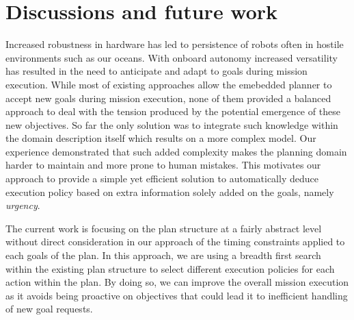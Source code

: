 \section{Discussions and future work}
\label{sec:conclude}

Increased robustness in hardware has led to persistence of robots
often in hostile environments such as our oceans. With onboard
autonomy increased versatility has resulted in the need to anticipate
and adapt to goals during mission execution. While most of existing
approaches allow the emebedded planner to accept new goals during
mission execution, none of them provided a balanced approach to deal
with the tension produced by the potential emergence of these new
objectives. So far the only solution was to integrate such knowledge
within the domain description itself which results on a more complex
model. Our experience demonstrated that such added complexity 
makes the planning domain harder to maintain and more prone to human
mistakes. This motivates our approach to provide a simple yet efficient 
solution to automatically deduce execution policy based on
extra information solely added on the goals, namely {\em urgency}.


The current work is focusing on the plan structure at a fairly
abstract level without direct consideration in our approach of the
timing constraints applied to each goals of the plan. In this approach,
we are using a breadth first search within the existing plan
structure to select different execution policies for each action
within the plan. By doing so, we can improve the overall mission 
execution as it avoids being proactive on objectives that could lead it
to inefficient handling of new goal requests.

